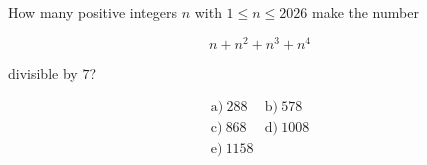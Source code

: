 How many positive integers \(n\) with \(1\le n\le 2026\) make the number



\[
n+n^2+n^3+n^4
\]

divisible by \(7\)?



\[
\begin{array}{ll}
\text{a)}\ 288 & \text{b)}\ 578 \\
\text{c)}\ 868 & \text{d)}\ 1008 \\
\text{e)}\ 1158
\end{array}
\]
